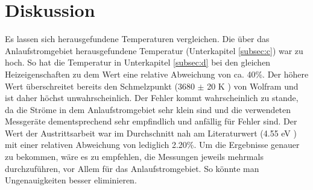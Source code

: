 \section{Diskussion}
\label{sec:Diskussion}
Es lassen sich herausgefundene Temperaturen vergleichen.
Die über das Anlaufstromgebiet herausgefundene Temperatur (Unterkapitel \ref{subsec:c}) war zu hoch.
So hat die Temperatur in Unterkapitel \ref{subsec:d} bei den gleichen Heizeigenschaften zu dem Wert eine relative Abweichung von ca. 40\%. Der höhere Wert
überschreitet bereits den Schmelzpunkt (3680 $\pm$ 20 K \cite{wolfram}) von Wolfram und ist daher höchst unwahrscheinlich. Der Fehler kommt wahrscheinlich zu stande, da die Ströme in dem Anlaufstromgebiet sehr klein sind und
die verwendeten Messgeräte dementsprechend sehr empfindlich und anfällig für Fehler sind.
Der Wert der Austrittsarbeit war im Durchschnitt nah am Literaturwert (4.55 eV \cite{wolfram}) mit einer relativen Abweichung von lediglich 2.20\%.
Um die Ergebnisse genauer zu bekommen, wäre es zu empfehlen, die Messungen jeweils mehrmals durchzuführen, vor Allem für das Anlaufstromgebiet.
So könnte man Ungenauigkeiten besser eliminieren.